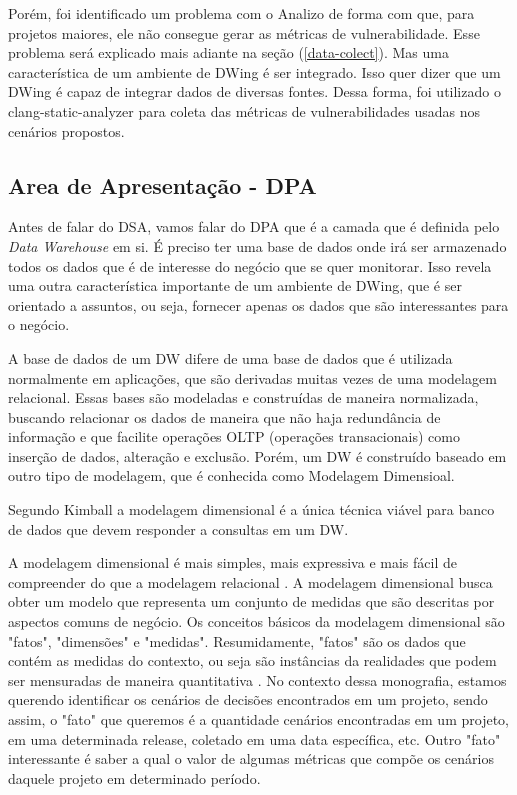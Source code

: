 Porém, foi identificado um problema com o Analizo de forma com que, para projetos maiores, ele não consegue gerar as métricas de vulnerabilidade. Esse problema será explicado mais adiante na seção (\ref{data-colect}). Mas uma característica de um ambiente de DWing é ser integrado. Isso quer dizer que um DWing é capaz de integrar dados de diversas fontes. Dessa forma, foi utilizado o clang-static-analyzer para coleta das métricas de vulnerabilidades usadas nos cenários propostos.


\subsection{Area de Apresentação - DPA}

Antes de falar do DSA, vamos falar do DPA que é a camada que é definida pelo \emph{Data Warehouse} em si. É preciso ter uma base de dados onde irá ser armazenado todos os dados que é de interesse do negócio que se quer monitorar. Isso revela uma outra característica importante de um ambiente de DWing, que é ser orientado a assuntos, ou seja, fornecer apenas os dados que são interessantes para o negócio.

A base de dados de um DW difere de uma base de dados que é utilizada normalmente em aplicações, que são derivadas muitas vezes de uma modelagem relacional. Essas bases são modeladas e construídas de maneira normalizada, buscando relacionar os dados de maneira que não haja redundância de informação e que facilite operações OLTP (operações transacionais) como inserção de dados, alteração e exclusão. Porém, um DW é construído baseado em outro tipo de modelagem, que é conhecida como Modelagem Dimensioal.

Segundo Kimball \citeyear{kimball2002} a modelagem dimensional é a única técnica viável para banco de dados  que devem responder a consultas em um DW.

A modelagem dimensional é mais simples, mais expressiva e mais fácil de compreender do que a modelagem relacional \cite{ballard1998}. A modelagem dimensional busca obter um modelo que representa um conjunto de medidas que são descritas por aspectos comuns de negócio.
%
Os conceitos básicos da modelagem dimensional são "fatos", "dimensões" e "medidas". Resumidamente, "fatos" são os dados que contém as medidas do contexto, ou seja são instâncias da realidades que podem ser mensuradas de maneira quantitativa \cite{kimball2002}. No contexto dessa monografia, estamos querendo identificar os cenários de decisões encontrados em um projeto, sendo assim, o "fato" que queremos é a quantidade cenários encontradas em um projeto, em uma determinada release, coletado em uma data específica, etc. Outro "fato" interessante é saber a qual o valor de algumas métricas que compõe os cenários daquele projeto em determinado período. 

